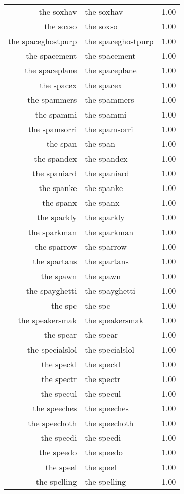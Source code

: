 \begin{table}[ht]
\begin{tabular}{rlr}
  the soxhav & the soxhav & 1.00 \\ 
  the soxso & the soxso & 1.00 \\ 
  the spaceghostpurp & the spaceghostpurp & 1.00 \\ 
  the spacement & the spacement & 1.00 \\ 
  the spaceplane & the spaceplane & 1.00 \\ 
  the spacex & the spacex & 1.00 \\ 
  the spammers & the spammers & 1.00 \\ 
  the spammi & the spammi & 1.00 \\ 
  the spamsorri & the spamsorri & 1.00 \\ 
  the span & the span & 1.00 \\ 
  the spandex & the spandex & 1.00 \\ 
  the spaniard & the spaniard & 1.00 \\ 
  the spanke & the spanke & 1.00 \\ 
  the spanx & the spanx & 1.00 \\ 
  the sparkly & the sparkly & 1.00 \\ 
  the sparkman & the sparkman & 1.00 \\ 
  the sparrow & the sparrow & 1.00 \\ 
  the spartans & the spartans & 1.00 \\ 
  the spawn & the spawn & 1.00 \\ 
  the spayghetti & the spayghetti & 1.00 \\ 
  the spc & the spc & 1.00 \\ 
  the speakersmak & the speakersmak & 1.00 \\ 
  the spear & the spear & 1.00 \\ 
  the specialslol & the specialslol & 1.00 \\ 
  the speckl & the speckl & 1.00 \\ 
  the spectr & the spectr & 1.00 \\ 
  the specul & the specul & 1.00 \\ 
  the speeches & the speeches & 1.00 \\ 
  the speechoth & the speechoth & 1.00 \\ 
  the speedi & the speedi & 1.00 \\ 
  the speedo & the speedo & 1.00 \\ 
  the speel & the speel & 1.00 \\ 
  the spelling & the spelling & 1.00 \\ 

\end{tabular}
\end{table}
